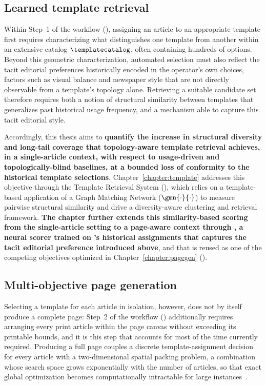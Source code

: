 \subsection{Learned template retrieval}
\label{sec:learned-template-retrieval}

Within Step~1 of the \melody workflow (), assigning an article to an appropriate template first requires characterizing what distinguishes one template from another within an extensive catalog $\templatecatalog$, often containing hundreds of  options. Beyond this geometric characterization, automated selection must also reflect the tacit editorial preferences historically encoded in the operator's own choices, factors such as visual balance and newspaper style that are not directly observable from a template's  topology alone. Retrieving a suitable candidate set therefore requires both a notion of structural similarity between templates that generalizes past historical usage frequency, and a mechanism able to capture this tacit editorial style.

Accordingly, this thesis aims to \textbf{quantify the increase in structural diversity and long-tail coverage that topology-aware template retrieval achieves, in a single-article context, with respect to usage-driven and topologically-blind baselines, at a bounded loss of conformity to the historical template selections}. 
Chapter~\ref{chapter:template} addresses this objective through the Template Retrieval System (\trs), which relies on a template-based application of a Graph Matching Network ($\gmn{\cdot}{\cdot}$) to measure pairwise structural similarity and drive a diversity-aware clustering and retrieval framework. 
\textbf{The chapter further extends this similarity-based scoring from the single-article setting to a page-aware context through \neuralmethod, a neural scorer trained on \melody's historical assignments that captures the tacit editorial preference introduced above}, and that is reused as one of the competing objectives optimized in Chapter~\ref{chapter:pagegen} ().

\subsection{Multi-objective page generation}
\label{sec:multi-objective-page-generation}

Selecting a template for each article in isolation, however, does not by itself produce a complete page: Step~2 of the \melody workflow () additionally requires arranging every print article within the page canvas without exceeding its printable bounds, and it is this step that accounts for most of the time currently required. Producing a full page couples a discrete template-assignment decision for every article with a two-dimensional spatial packing problem, a combination whose search space grows exponentially with the number of articles, so that exact global optimization becomes computationally intractable for large instances~\cite{lodi-packing-survey}. 

